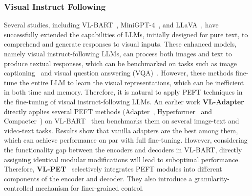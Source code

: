 \subsubsection{Visual Instruct Following}
Several studies, including VL-BART~\cite{cho2021unifying}, MiniGPT-4~\cite{zhu2023minigpt}, and LLaVA~\cite{liu2023visual}, have successfully extended the capabilities of LLMs, initially designed for pure text, to comprehend and generate responses to visual inputs. These enhanced models, namely visual instruct-following LLMs, can process both images and text to produce textual responses, which can be benchmarked on tasks such as image captioning~\cite{rennie2017self,you2016image,vinyals2016show,hossain2019comprehensive} and visual question answering (VQA)~\cite{wang2017fvqa,wu2017visual,antol2015vqa}.
However, these methods fine-tune the entire LLM to learn the visual representations, which can be inefficient in both time and memory. Therefore, it is natural to apply PEFT techniques in the fine-tuning of visual instruct-following LLMs. 
An earlier work \textbf{VL-Adapter}~\cite{sung2022vl} directly applies several PEFT methods (Adapter~\cite{9-peft-transfer-learning}, Hyperformer~\cite{mahabadi2021parameter} and Compacter~\cite{2-Compacter}) on VL-BART~\cite{cho2021unifying} then benchmarks them on several image-text and video-text tasks. Results show that vanilla adapters are the best among them, which can achieve performance on par with full fine-tuning.
However, considering the functionality gap between the encoders and decoders in VL-BART, directly assigning identical modular modifications will lead to suboptimal performance. Therefore, \textbf{VL-PET}~\cite{hu2023vl} selectively integrates PEFT modules into different components of the encoder and decoder. They also introduce a granularity-controlled mechanism for finer-grained control.


